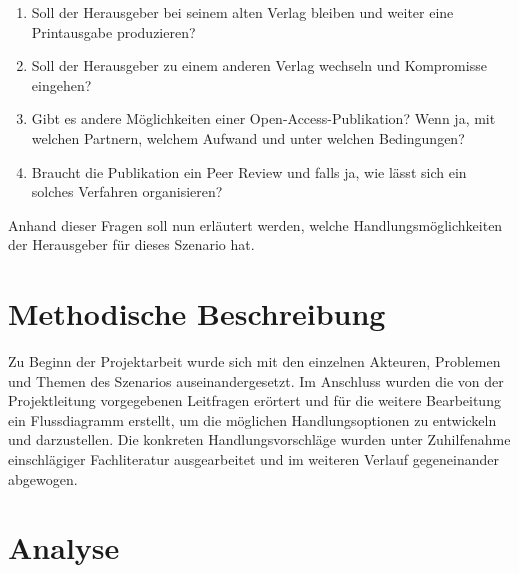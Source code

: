 \documentclass[a4paper,
fontsize=11pt,
oneside,
numbers=noperiodatend,
parskip=half-,
bibliography=totoc,
final
]{scrartcl}
\begin{document}
\begin{enumerate}
\def\labelenumi{\arabic{enumi}.}
\tightlist
\item
  Soll der Herausgeber bei seinem alten Verlag bleiben und weiter eine
  Printausgabe produzieren?
\item
  Soll der Herausgeber zu einem anderen Verlag wechseln und Kompromisse
  eingehen?
\item
  Gibt es andere Möglichkeiten einer Open-Access-Publikation? Wenn ja,
  mit welchen Partnern, welchem Aufwand und unter welchen Bedingungen?
\item
  Braucht die Publikation ein Peer Review und falls ja, wie lässt sich
  ein solches Verfahren organisieren?
\end{enumerate}

Anhand dieser Fragen soll nun erläutert werden, welche
Handlungsmöglichkeiten der Herausgeber für dieses Szenario hat.

\section*{Methodische Beschreibung}\label{methodische-beschreibung}

Zu Beginn der Projektarbeit wurde sich mit den einzelnen Akteuren,
Problemen und Themen des Szenarios auseinandergesetzt. Im Anschluss
wurden die von der Projektleitung vorgegebenen Leitfragen erörtert und
für die weitere Bearbeitung ein Flussdiagramm erstellt, um die möglichen
Handlungsoptionen zu entwickeln und darzustellen. Die konkreten
Handlungsvorschläge wurden unter Zuhilfenahme einschlägiger
Fachliteratur ausgearbeitet und im weiteren Verlauf gegeneinander
abgewogen.

\section*{Analyse}\label{analyse}
\end{document}
